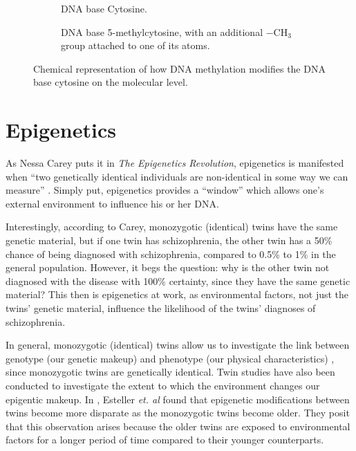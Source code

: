 \documentclass[12pt, twoside, a4paper]{report}
\begin{document}
\begin{figure}[t!]
\begin{subfigure}[t]{0.5\textwidth}
	\centering
	\caption{DNA base Cytosine.}
\end{subfigure}%
\begin{subfigure}[t]{0.5\textwidth}
	\centering
	\caption{DNA base 5-methylcytosine, with an additional $-$CH$_3$ group attached to one of its atoms.}
\end{subfigure}
\caption{Chemical representation of how DNA methylation modifies the DNA base cytosine on the molecular level.}
\label{bg:bio:methylation}
\end{figure}

\section{Epigenetics} \label{bg:epi}
As Nessa Carey puts it in \textit{The Epigenetics Revolution}, epigenetics is manifested when ``two genetically identical individuals are non-identical in some way we can measure'' \cite{RefWorks:248}. Simply put, epigenetics provides a ``window'' which allows one's external environment to influence his or her DNA.

Interestingly, according to Carey, monozygotic (identical) twins have the same genetic material, but if one twin has schizophrenia, the other twin has a 50\% chance of being diagnosed with schizophrenia, compared to 0.5\% to 1\% in the general population. However, it begs the question: why is the other twin not diagnosed with the disease with 100\% certainty, since they have the same genetic material? This then is epigenetics at work, as environmental factors, not just the twins' genetic material, influence the likelihood of the twins' diagnoses of schizophrenia.

In general, monozygotic (identical) twins allow us to investigate the link between genotype (our genetic makeup) and phenotype (our physical characteristics) \cite{RefWorks:104, RefWorks:250}, since monozygotic twins are genetically identical. Twin studies have also been conducted to investigate the extent to which the environment changes our epigentic makeup. In \cite{RefWorks:251}, Esteller \textit{et. al} found that epigenetic modifications between twins become more disparate as the monozygotic twins become older. They posit that this observation arises because the older twins are exposed to environmental factors for a longer period of time compared to their younger counterparts.
\end{document}
